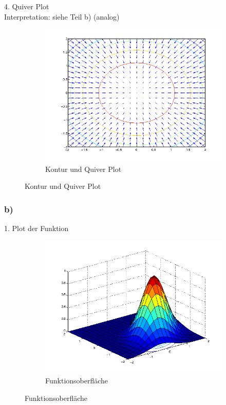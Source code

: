 \documentclass{article}
\begin{document}
	 	4. Quiver Plot\\
	 	Interpretation: siehe Teil b) (analog)
		\begin{figure}[H]
		  \begin{subfigure}
		    \centering
		    \includegraphics[scale=0.5,bb=0 0 576 432]{task3-f1-quiver.png}
			\caption{Kontur und Quiver Plot}
		  \end{subfigure}
		\end{figure}
		
		
		
		
	 \subsubsection*{b)}
	 	1. Plot der Funktion
		\begin{figure}[H]
		  \begin{subfigure}
		    \centering
		    \includegraphics[scale=0.5,bb=0 0 576 432]{task3-f2.png}
			\caption{Funktionsoberfläche}
		  \end{subfigure}
		\end{figure}
	
\end{document}
